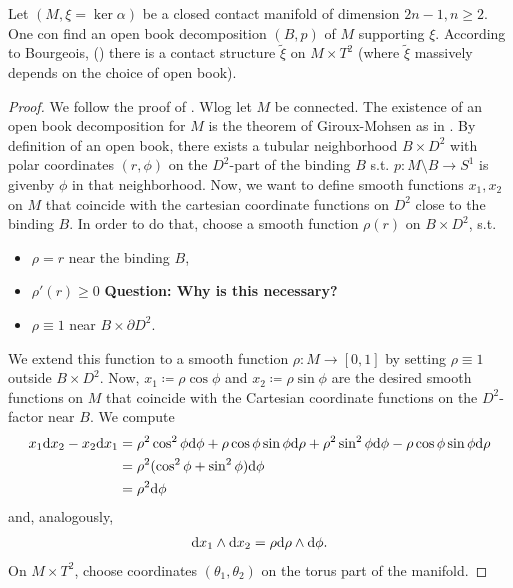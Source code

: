 \begin{theorem}\label{thm:bourgeois}
    Let $(M, \xi = \ker \alpha )$ be a closed contact manifold of dimension $2n - 1, n \geq 2$. One con find an open book decomposition $(B,p)$ of $M$ supporting $\xi$. According to Bourgeois, (\cite{Bourgeois02}) there is a contact structure $\tilde{\xi}$ on $M \times T^2$ (where $\tilde \xi$ massively depends on the choice of open book).
\end{theorem}
\begin{proof}
    We follow the proof of \cite[Thm 7.3.6]{Geiges08}.
    Wlog let $M$ be connected.
    The existence of an open book decomposition for $M$ is the theorem of Giroux-Mohsen as in \cite[Thm 7.3.5]{Geiges08}.
    By definition of an open book, there exists a tubular neighborhood $B \times D^2$ with polar coordinates $(r, \phi)$ on the $D^2$-part of the binding $B$ s.t. $p: M \setminus B \to S^1$ is givenby $\phi$ in that neighborhood.
    Now, we want to define smooth functions $x_1, x_2$ on $M$ that coincide with the cartesian coordinate functions on $D^2$ close to the binding $B$. In order to do that, choose a smooth function $\rho(r)$ on $B \times D^2$, s.t. 
    \begin{itemize}
        \item $\rho = r$ near the binding $B$,
        \item $\rho'(r) \geq 0$ \textbf{Question: Why is this necessary?}
        \item $\rho \equiv 1$ near $B \times \partial D^2$.
    \end{itemize}
    We extend this function to a smooth function $\rho: M \to [0,1]$
    by setting $\rho \equiv 1$ outside $B\times D^2$.
    Now, $x_1 \coloneqq \rho \cos \phi$ and $x_2 \coloneqq \rho \sin \phi$ are the desired smooth functions on $M$ that coincide with the Cartesian coordinate functions on the $D^2$-factor near $B$.
    We compute
    \begin{align*}
        x_1 \mathrm{d} x_2 - x_2 \mathrm{d} x_1 &= \rho^2 \cos^2 \phi \mathrm{d} \phi + \rho \cos \phi \sin \phi \mathrm{d} \rho + \rho^2 \sin^2 \phi \mathrm{d} \phi - \rho \cos \phi \sin \phi \mathrm{d} \rho\\
        &= \rho^2 (\cos^2 \phi + \sin^2 \phi) \mathrm{d} \phi\\
        &= \rho^2 \mathrm{d} \phi
    \end{align*}
    and, analogously,
    \begin{align*}
        \mathrm{d} x_1 \wedge \mathrm{d} x_2 = \rho \mathrm{d} \rho \wedge \mathrm{d} \phi.
    \end{align*}
    On $M\times T^2$, choose coordinates $(\theta_1, \theta_2)$ on the torus part of the manifold.

\end{proof}

